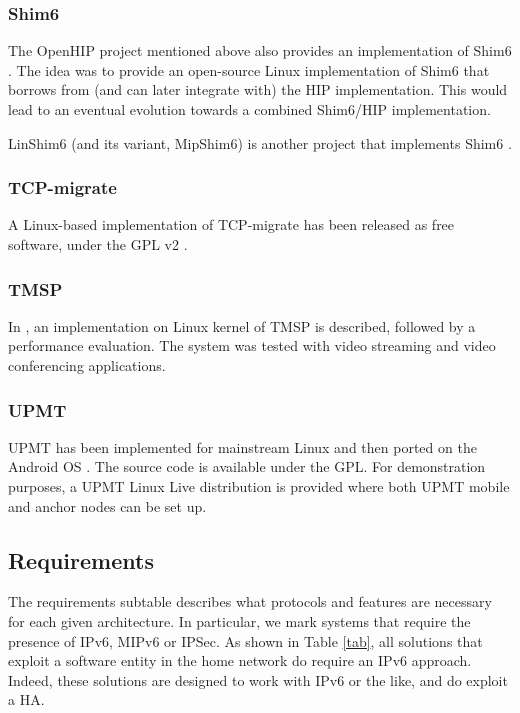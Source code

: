 \documentclass[preprint,12pt]{elsarticle}
\begin{document}
\subsubsection*{Shim6} 
The OpenHIP project mentioned above also provides 
an implementation of Shim6 \cite{openhip_tech}. The idea was to 
provide an open-source Linux implementation of Shim6 that borrows from (and can 
later integrate with) the HIP implementation. This would lead to an eventual 
evolution towards a combined Shim6/HIP implementation.

LinShim6 (and its variant, MipShim6) is another project that implements Shim6 
\cite{Barre:2011}.

\subsubsection*{TCP-migrate} 
A Linux-based implementation of TCP-migrate has been released as free software, 
under the \ac{GPL} v2 \cite{tcp-migrate}. 

\subsubsection*{TMSP} 
In \cite{LimYLL09}, an implementation on Linux kernel of TMSP is described, 
followed by a performance evaluation. The system was tested with video 
streaming and video conferencing applications.  

\subsubsection*{UPMT} 
UPMT has been implemented for mainstream Linux and then ported on the 
Android OS \cite{Bonola:2009,upmt:website}. The source code is available under 
the \ac{GPL}. For demonstration purposes, a UPMT Linux Live 
distribution is provided where both UPMT mobile and anchor nodes can be set up.


\subsection{Requirements}

The requirements subtable describes what protocols and features are necessary for each given architecture.
In particular, we mark systems that require the presence of IPv6, MIPv6 or
IPSec. As shown in Table \ref{tab}, all solutions that exploit a software entity 
in the home network do require an IPv6 approach. Indeed, these solutions are 
designed to work with IPv6 or the like, and do exploit a \ac{HA}.
\end{document}
